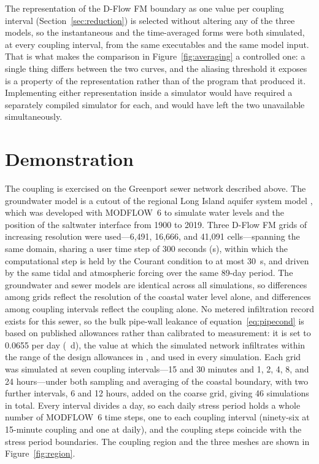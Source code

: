 \documentclass[preprint,authoryear,11pt]{elsarticle}
\begin{document}
The representation of the D-Flow FM boundary as one value per coupling interval (Section~\ref{sec:reduction}) is selected without altering any of the three models, so the instantaneous and the time-averaged forms were both simulated, at every coupling interval, from the same executables and the same model input. That is what makes the comparison in Figure~\ref{fig:averaging} a controlled one: a single thing differs between the two curves, and the aliasing threshold it exposes is a property of the representation rather than of the program that produced it. Implementing either representation inside a simulator would have required a separately compiled simulator for each, and would have left the two unavailable simultaneously.

\section{Demonstration}

The coupling is exercised on the Greenport sewer network described above. The groundwater model is a cutout of the regional Long Island aquifer system model \citep{walter2024longisland}, which was developed with MODFLOW~6 to simulate water levels and the position of the saltwater interface from 1900 to 2019. Three D-Flow FM grids of increasing resolution were used---6,491, 16,666, and 41,091 cells---spanning the same domain, sharing a user time step of 300 seconds (\si{\second}), within which the computational step is held by the Courant condition to at most \SI{30}{\second}, and driven by the same tidal and atmospheric forcing over the same 89-day period. The groundwater and sewer models are identical across all simulations, so differences among grids reflect the resolution of the coastal water level alone, and differences among coupling intervals reflect the coupling alone. No metered infiltration record exists for this sewer, so the bulk pipe-wall leakance of equation~\ref{eq:pipecond} is based on published allowances rather than calibrated to measurement: it is set to 0.0655 per day (\si{\per\day}), the value at which the simulated network infiltrates within the range of the design allowances in \cite{asce2007gravity}, and used in every simulation. Each grid was simulated at seven coupling intervals---15 and 30 minutes and 1, 2, 4, 8, and 24 hours---under both sampling and averaging of the coastal boundary, with two further intervals, 6 and 12 hours, added on the coarse grid, giving 46 simulations in total. Every interval divides a day, so each daily stress period holds a whole number of MODFLOW~6 time steps, one to each coupling interval (ninety-six at 15-minute coupling and one at daily), and the coupling steps coincide with the stress period boundaries. The coupling region and the three meshes are shown in Figure~\ref{fig:region}.
\end{document}
